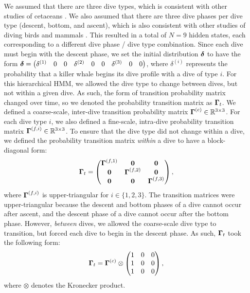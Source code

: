 We assumed that there are three dive types, which is consistent with other studies of cetaceans \citep[e.g.][]{Barajas:2017}. We also assumed that there are three dive phases per dive type (descent, bottom, and ascent), which is also consistent with other studies of diving birds and mammals \citep[e.g.][]{Vivant:2014}. This resulted in a total of $N = 9$ hidden states, each corresponding to a different dive phase / dive type combination.
%
Since each dive must begin with the descent phase, we set the initial distribution $\boldsymbol{\delta}$ to have the form
%
    $\boldsymbol{\delta} = \begin{pmatrix} \delta^{(1)} & 0 & 0 & \delta^{(2)} & 0 & 0 & \delta^{(3)} & 0 & 0 \end{pmatrix}$,
%
where $\delta^{(i)}$ represents the probability that a killer whale begins its dive profile with a dive of type $i$. 
%
For this hierarchical HMM, we allowed the dive type to change between dives, but not within a given dive. As such, the form of transition probability matrix changed over time, so we denoted the probability transition matrix as $\boldsymbol{\Gamma}_t$. We defined a coarse-scale, inter-dive transition probability matrix $\boldsymbol{\Gamma}^{(c)} \in \mathbb{R}^{3 \times 3}$. For each dive type $i$, we also defined a fine-scale, intra-dive probability transition matrix $\boldsymbol{\Gamma}^{(f,i)} \in \mathbb{R}^{3 \times 3}$. 
%
To ensure that the dive type did not change within a dive, we defined the probability transition matrix \textit{within} a dive to have a block-diagonal form:
%
\begin{equation}
    \boldsymbol{\Gamma}_t = 
    \begin{pmatrix}
        \boldsymbol{\Gamma}^{(f,1)} & \mathbf{0} & \mathbf{0} \\
        \mathbf{0} & \boldsymbol{\Gamma}^{(f,2)} & \mathbf{0} \\
        \mathbf{0} & \mathbf{0} & \boldsymbol{\Gamma}^{(f,3)} \\
    \end{pmatrix},
\end{equation}
%
where $\boldsymbol{\Gamma}^{(f,i)}$ is upper-triangular for $i \in \{1,2,3\}$. The transition matrices were upper-triangular because the descent and bottom phases of a dive cannot occur after ascent, and the descent phase of a dive cannot occur after the bottom phase.
%
However, \textit{between} dives, we allowed the coarse-scale dive type to transition, but forced each dive to begin in the descent phase. As such, $\boldsymbol{\Gamma}_t$ took the following form:
%
\begin{equation}
    \boldsymbol{\Gamma}_t = \boldsymbol{\Gamma}^{(c)} \otimes \begin{pmatrix} 1 & 0 & 0 \\ 1 & 0 & 0 \\ 1 & 0 & 0 \end{pmatrix},
\end{equation}
%
where $\otimes$ denotes the Kronecker product.

